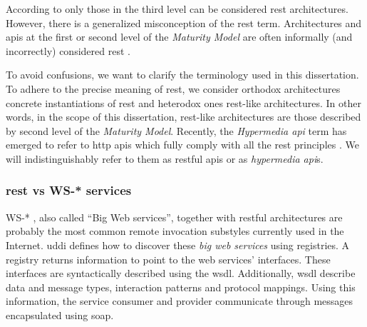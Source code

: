 According to \citet{fielding_architectural_2000} only those in the third level can be considered \ac{rest} architectures.
However, there is a generalized misconception of the \ac{rest} term.
Architectures and \ac{api}s at the first or second level of the \emph{\citeauthor{richardson_introducing_2008} Maturity Model} are often informally (and incorrectly) considered \ac{rest} \citep{fielding_rest_2008,moore_hypermedia_2010,klabnik_nobody_2011}.


To avoid confusions, we want to clarify the terminology used in this dissertation.
To adhere to the precise meaning of \ac{rest}, we consider orthodox architectures concrete instantiations of \ac{rest} and heterodox ones \ac{rest}-like architectures.
In other words, in the scope of this dissertation, \ac{rest}-like architectures are those described by second level of the \emph{\citeauthor{richardson_introducing_2008} Maturity Model}.
Recently, the \emph{Hypermedia \ac{api}} term has emerged to refer to \acs{http} \ac{api}s which fully comply with all the \ac{rest} principles \citep{klabnik_rest_2012,moore_hypermedia_2010,amundsen_building_2011}.  %
We will indistinguishably refer to them as \ac{rest}ful \ac{api}s or as \emph{hypermedia \ac{api}}s.



\subsubsection{\acs{rest} vs WS-* services}
\label{sec:protocols}

WS-* \citep{newcomer_understanding_2002,alonso_web_2010}, also called ``Big Web services'', together with \acs{rest}ful architectures are probably the most common remote invocation substyles currently used in the Internet.
\ac{uddi} defines how to discover these \emph{big web services} using registries.
A registry returns information to point to the web services' interfaces.
These interfaces are syntactically described using the \ac{wsdl}.
Additionally, \ac{wsdl} describe data and message types, interaction patterns and protocol mappings.
Using this information, the service consumer and provider communicate through messages encapsulated using \ac{soap}.


